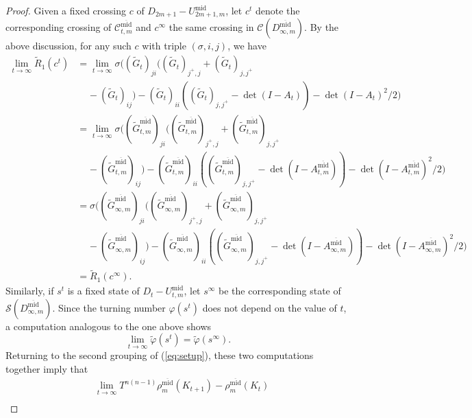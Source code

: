 \documentclass[10pt,a4paper]{amsart}
\begin{document}
\begin{proof}
		Given a fixed crossing $c$ of $D_{2m + 1} - U^\text{mid}_{2m + 1,m}$, let $c^t$ denote the corresponding crossing of $\mathcal{C}^{\overline{\text{mid}}}_{t,m}$ and $c^\infty$ the same crossing in $\mathcal{C}(D^{\overline{\text{mid}}}_{\infty,m})$. By the above discussion, for any such $c$ with triple $(\sigma, i,j)$, we have
		\begin{align*}
		\lim_{t \to \infty} \widetilde{R}_1(c^t) &= \lim_{t \to \infty}\sigma((\widetilde{G}_t)_{ji}((\widetilde{G}_t)_{j^+, j} + (\widetilde{G}_t)_{j, j^+} \\
		& \ \ \ \ \ - (\widetilde{G}_t)_{ij}) - (\widetilde{G}_t)_{ii}((\widetilde{G}_t)_{j,j^+} - \det(I - A_t)) - \det(I - A_t)^2/2) \\
		&= \lim_{t \to \infty}\sigma((\widetilde{G}^{\overline{\text{mid}}}_{t,m})_{ji}((\widetilde{G}^{\overline{\text{mid}}}_{t,m})_{j^+, j} + (\widetilde{G}^{\overline{\text{mid}}}_{t,m})_{j, j^+} \\
		& \ \ \ \ \ - (\widetilde{G}^{\overline{\text{mid}}}_{t,m})_{ij}) - (\widetilde{G}^{\overline{\text{mid}}}_{t,m})_{ii}((\widetilde{G}^{\overline{\text{mid}}}_{t,m})_{j,j^+} - \det(I - A^{\overline{\text{mid}}}_{t,m})) - \det(I - A^{\overline{\text{mid}}}_{t,m})^2/2) \\
		&= \sigma((\widetilde{G}^{\overline{\text{mid}}}_{\infty,m})_{ji}((\widetilde{G}^{\overline{\text{mid}}}_{\infty,m})_{j^+, j} + (\widetilde{G}^{\overline{\text{mid}}}_{\infty,m})_{j, j^+} \\
		& \ \ \ \ \ - (\widetilde{G}^{\overline{\text{mid}}}_{\infty,m})_{ij}) - (\widetilde{G}^{\overline{\text{mid}}}_{\infty,m})_{ii}((\widetilde{G}^{\overline{\text{mid}}}_{\infty,m})_{j,j^+} - \det(I - A^{\overline{\text{mid}}}_{\infty,m})) - \det(I - A^{\overline{\text{mid}}}_{\infty,m})^2/2) \\
		&= \tilde{R}_1(c^\infty).
		\end{align*}
		Similarly, if $s^t$ is a fixed state of $D_t - U^\text{mid}_{t,m}$, let $s^\infty$ be the corresponding state of $\mathcal{S}(D^{\overline{\text{mid}}}_{\infty,m})$. Since the turning number $\varphi(s^t)$ does not depend on the value of $t$, a computation analogous to the one above shows
		$$
		\lim_{t \to \infty} \tilde{\varphi}(s^t) = \tilde{\varphi}(s^\infty).
		$$
		Returning to the second grouping of (\ref{eq:setup}), these two computations together imply that
		\begin{align*}
		&\lim_{t \to \infty} T^{n(n - 1)} \rho^{\overline{\text{mid}}}_m(K_{t + 1}) -  \rho^{\overline{\text{mid}}}_m(K_t) \\

\end{align*}
\end{proof}
\end{document}
